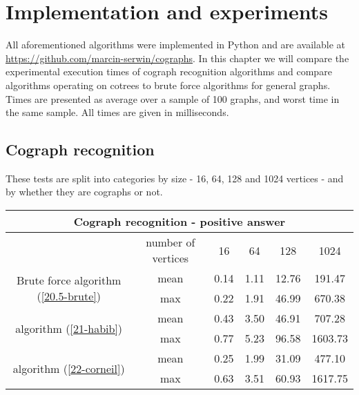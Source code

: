 \chapter{Implementation and experiments}
\label{r:experiments}

All aforementioned algorithms were implemented in Python and are available at \url{https://github.com/marcin-serwin/cographs}. In this chapter we will compare the experimental execution times of cograph recognition algorithms and compare algorithms operating on cotrees to brute force algorithms for general graphs. Times are presented as average over a sample of 100 graphs, and worst time in the same sample. All times are given in milliseconds.

\section{Cograph recognition}
These tests are split into categories by size - 16, 64, 128 and 1024 vertices - and by whether they are cographs or not.

\begin{center}

    \begin{tabular}{ |c|c|c|c|c|c|}
        \hline
        \multicolumn{6}{|c|}{Cograph recognition - positive answer}                                                        \\
        \hline
                                                                      & number of vertices & 16   & 64   & 128   & 1024    \\
        \hline
        \multirow{2}{*}{Brute force algorithm (\ref{20.5-brute})}     & mean               & 0.14 & 1.11 & 12.76 & 191.47  \\
                                                                      & max                & 0.22 & 1.91 & 46.99 & 670.38  \\
        \hline
        \multirow{2}{*}{\cite{habib} algorithm (\ref{21-habib})}      & mean               & 0.43 & 3.50 & 46.91 & 707.28  \\
                                                                      & max                & 0.77 & 5.23 & 96.58 & 1603.73 \\
        \hline
        \multirow{2}{*}{\cite{corneil} algorithm (\ref{22-corneil}) } & mean               & 0.25 & 1.99 & 31.09 & 477.10  \\
                                                                      & max                & 0.63 & 3.51 & 60.93 & 1617.75 \\
        \hline
    \end{tabular}
\end{center}

